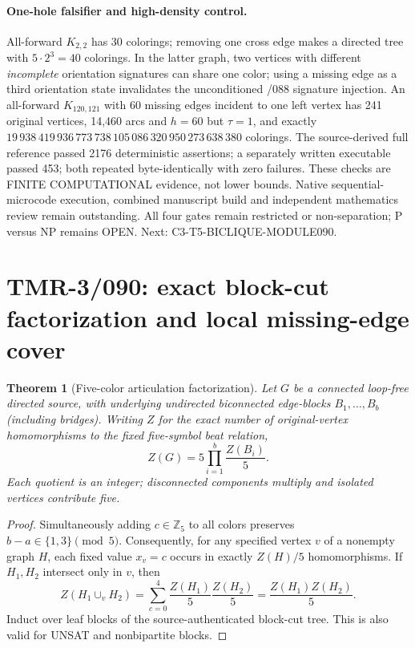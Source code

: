 \documentclass[11pt]{article}
\newtheorem{theorem}{Theorem}
\begin{document}
\paragraph{One-hole falsifier and high-density control.}
All-forward $K_{2,2}$ has 30 colorings; removing one cross edge makes a
directed tree with $5\cdot2^3=40$ colorings. In the latter graph, two
vertices with different \emph{incomplete} orientation signatures can
share one color; using a missing edge as a third orientation state
invalidates the unconditioned /088 signature injection.
An all-forward $K_{120,121}$ with 60 missing edges incident to one left
vertex has 241 original vertices, 14{,}460 arcs and $h=60$ but
$\tau=1$, and exactly
$19\,938\,419\,936\,773\,738\,105\,086\,320\,950\,273\,638\,380$
colorings.
The source-derived full reference passed 2176 deterministic assertions;
a separately written executable passed 453; both repeated
byte-identically with zero failures. These checks are FINITE
COMPUTATIONAL evidence, not lower bounds. Native sequential-microcode
execution, combined manuscript build and independent mathematics review
remain outstanding. All four gates remain restricted or non-separation;
P versus NP remains OPEN. Next: C3-T5-BICLIQUE-MODULE090.


\section{TMR-3/090: exact block-cut factorization and local missing-edge cover}
\begin{theorem}[Five-color articulation factorization]
Let $G$ be a connected loop-free directed source, with underlying
undirected biconnected edge-blocks $B_1,\ldots,B_b$ (including bridges).
Writing $Z$ for the exact number of original-vertex homomorphisms to
the fixed five-symbol beat relation,
\[
\boxed{Z(G)=5\prod_{i=1}^{b}\frac{Z(B_i)}5.}
\]
Each quotient is an integer; disconnected components multiply and
isolated vertices contribute five.
\end{theorem}
\begin{proof}
Simultaneously adding $c\in\mathbb Z_5$ to all colors preserves
$b-a\in\{1,3\}\pmod5$. Consequently, for any specified vertex $v$ of
a nonempty graph $H$, each fixed value $x_v=c$ occurs in exactly
$Z(H)/5$ homomorphisms. If $H_1,H_2$ intersect only in $v$, then
\[
Z(H_1\cup_v H_2)=
\sum_{c=0}^{4}\frac{Z(H_1)}5\frac{Z(H_2)}5
=\frac{Z(H_1)Z(H_2)}5.
\]
Induct over leaf blocks of the source-authenticated block-cut tree.
This is also valid for UNSAT and nonbipartite blocks.
\end{proof}
\end{document}
